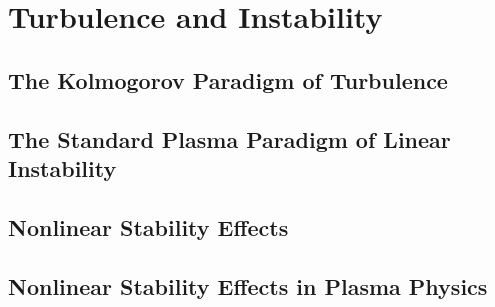 \chapter{Turbulence and Instability}

\section{The Kolmogorov Paradigm of Turbulence}

\section{The Standard Plasma Paradigm of Linear Instability}

\section{Nonlinear Stability Effects}

\section{Nonlinear Stability Effects in Plasma Physics}

